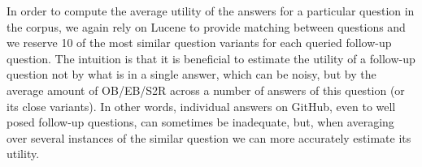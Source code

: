 In order to compute the average utility of the answers for a particular question in the corpus, we again rely on Lucene to provide
matching between questions and we reserve 10 of the most similar question variants for each queried follow-up question. The intuition is that it is beneficial to estimate the utility of a follow-up question not by what is in a single answer, which can be noisy, but by the average amount of OB/EB/S2R across a number of answers of this question (or its close variants). In other words, individual answers on GitHub, even to well posed follow-up questions, can sometimes be inadequate, but, when averaging over several instances of the similar question we can more accurately estimate its utility.


%
%
%
